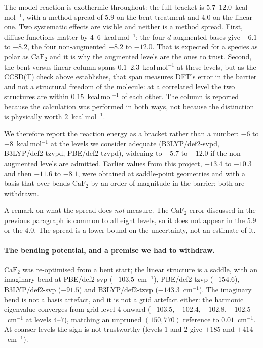 The model reaction is exothermic throughout: the full bracket is
$5.7$--$12.0$~kcal\,mol$^{-1}$, with a method spread of $5.9$ on the bent treatment
and $4.0$ on the linear one. Two systematic effects are visible and neither is a
method spread. First, diffuse functions matter by $4$--$6$~kcal\,mol$^{-1}$: the
four $d$-augmented bases give $-6.1$ to $-8.2$, the four non-augmented $-8.2$ to
$-12.0$. That is expected for a species as polar as $\mathrm{CaF_2}$ and it is why
the augmented levels are the ones to trust. Second, the bent-versus-linear column spans
$0.1$--$2.3$~kcal\,mol$^{-1}$ at these levels, but as the CCSD(T) check above
establishes, that span measures DFT's error in the barrier and not a structural
freedom of the molecule: at a correlated level the two structures are within
$0.15$~kcal\,mol$^{-1}$ of each other. The column is reported because the
calculation was performed in both ways, not because the distinction is physically
worth $2$~kcal\,mol$^{-1}$.

We therefore report the reaction energy as a bracket rather than a number:
$-6$ to $-8$~kcal\,mol$^{-1}$ at the levels we consider adequate
(B3LYP/def2-svpd, B3LYP/def2-tzvpd, PBE/def2-tzvpd), widening to $-5.7$ to
$-12.0$ if the non-augmented levels are admitted. Earlier values from this project,
$-13.4$ to $-10.3$ and then $-11.6$ to $-8.1$, were obtained at saddle-point
geometries and with a basis that over-bends $\mathrm{CaF_2}$ by an order of
magnitude in the barrier; both are withdrawn.

A remark on what the spread does \emph{not} measure. The $\mathrm{CaF_2}$ error
discussed in the previous paragraph is common to all eight levels, so it does not
appear in the $5.9$ or the $4.0$. The spread is a lower bound on the uncertainty,
not an estimate of it.

\paragraph{The bending potential, and a premise we had to withdraw.}
$\mathrm{CaF_2}$ was re-optimised from a bent start; the linear structure is a
saddle, with an imaginary bend at PBE/def2-svp ($-103.5$~cm$^{-1}$), PBE/def2-tzvp
($-154.6$), B3LYP/def2-svp ($-91.5$) and B3LYP/def2-tzvp ($-143.3$~cm$^{-1}$). The
imaginary bend is not a basis artefact, and it is not a grid artefact either: the
harmonic eigenvalue converges from grid level $4$ onward ($-103.5$, $-102.4$,
$-102.8$, $-102.5$~cm$^{-1}$ at levels $4$--$7$), matching an unpruned $(150,770)$
reference to $0.01$~cm$^{-1}$. At coarser levels the sign is not trustworthy
(levels $1$ and $2$ give $+185$ and $+414$~cm$^{-1}$).

